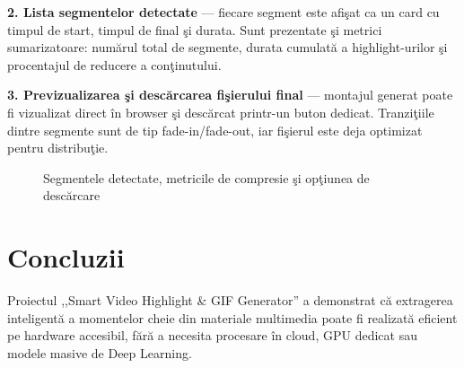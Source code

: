 \documentclass[12pt,a4paper]{article}
\begin{document}
\textbf{2. Lista segmentelor detectate} --- fiecare segment este afi\c{s}at ca un card cu timpul de start, timpul de final \c{s}i durata. Sunt prezentate \c{s}i metrici sumarizatoare: num\u{a}rul total de segmente, durata cumulat\u{a}{} a highlight-urilor \c{s}i procentajul de reducere a con\c{t}inutului.

\textbf{3. Previzualizarea \c{s}i desc\u{a}rcarea fi\c{s}ierului final} --- montajul generat poate fi vizualizat direct \^{i}n browser \c{s}i desc\u{a}rcat printr-un buton dedicat. Tranzi\c{t}iile dintre segmente sunt de tip fade-in/fade-out, iar fi\c{s}ierul este deja optimizat pentru distribu\c{t}ie.

\begin{figure}[H]
    \centering
    \vspace{5cm}
    \vspace{0.3cm}
    \caption{Segmentele detectate, metricile de compresie \c{s}i op\c{t}iunea de desc\u{a}rcare}
    \label{fig:segments}
\end{figure}


\section{Concluzii}

Proiectul ,,Smart Video Highlight \& GIF Generator'' a demonstrat c\u{a}{} extragerea inteligent\u{a}{} a momentelor cheie din materiale multimedia poate fi realizat\u{a}{} eficient pe hardware accesibil, f\u{a}r\u{a}{} a necesita procesare \^{i}n cloud, GPU dedicat sau modele masive de Deep Learning.
\end{document}
